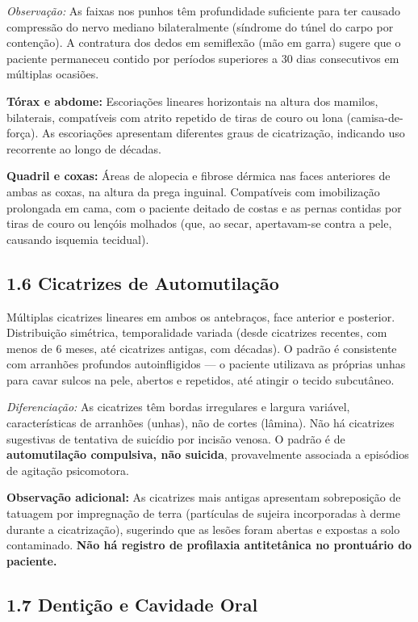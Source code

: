 \textit{Observação:} As faixas nos punhos têm profundidade suficiente para ter causado compressão do nervo mediano bilateralmente (síndrome do túnel do carpo por contenção). A contratura dos dedos em semiflexão (mão em garra) sugere que o paciente permaneceu contido por períodos superiores a 30 dias consecutivos em múltiplas ocasiões.

\textbf{Tórax e abdome:} Escoriações lineares horizontais na altura dos mamilos, bilaterais, compatíveis com atrito repetido de tiras de couro ou lona (camisa-de-força). As escoriações apresentam diferentes graus de cicatrização, indicando uso recorrente ao longo de décadas.

\textbf{Quadril e coxas:} Áreas de alopecia e fibrose dérmica nas faces anteriores de ambas as coxas, na altura da prega inguinal. Compatíveis com imobilização prolongada em cama, com o paciente deitado de costas e as pernas contidas por tiras de couro ou lençóis molhados (que, ao secar, apertavam-se contra a pele, causando isquemia tecidual).

\subsection*{1.6 Cicatrizes de Automutilação}

Múltiplas cicatrizes lineares em ambos os antebraços, face anterior e posterior. Distribuição simétrica, temporalidade variada (desde cicatrizes recentes, com menos de 6 meses, até cicatrizes antigas, com décadas). O padrão é consistente com arranhões profundos autoinfligidos --- o paciente utilizava as próprias unhas para cavar sulcos na pele, abertos e repetidos, até atingir o tecido subcutâneo.

\textit{Diferenciação:} As cicatrizes têm bordas irregulares e largura variável, características de arranhões (unhas), não de cortes (lâmina). Não há cicatrizes sugestivas de tentativa de suicídio por incisão venosa. O padrão é de \textbf{automutilação compulsiva, não suicida}, provavelmente associada a episódios de agitação psicomotora.

\textbf{Observação adicional:} As cicatrizes mais antigas apresentam sobreposição de tatuagem por impregnação de terra (partículas de sujeira incorporadas à derme durante a cicatrização), sugerindo que as lesões foram abertas e expostas a solo contaminado. \textbf{Não há registro de profilaxia antitetânica no prontuário do paciente.}

\subsection*{1.7 Dentição e Cavidade Oral}

